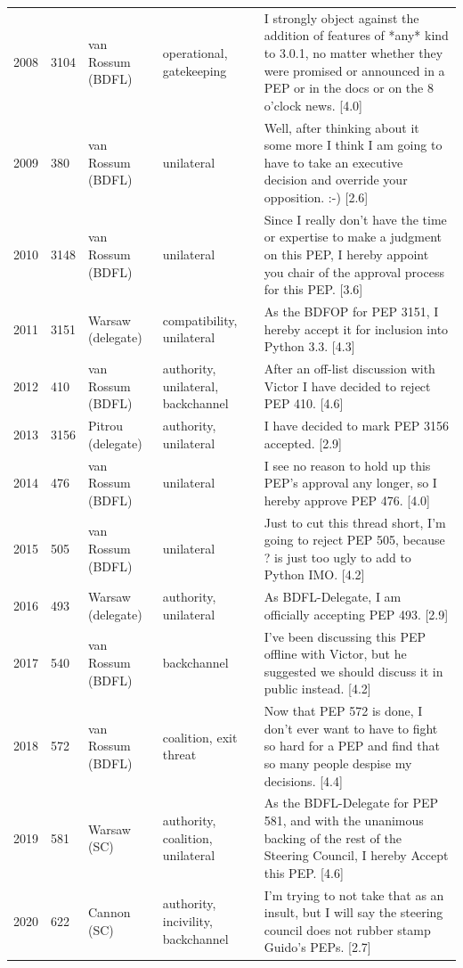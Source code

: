 \begin{table}[t]
\begin{tabular}{p{}p{}p{}p{}p{}}
2008 & 3104 & van Rossum (BDFL) & operational, gatekeeping & I strongly object against the addition of features of *any* kind to 3.0.1, no matter whether they were promised or announced in a PEP or in the docs or on the 8 o'clock news. [4.0] \\
2009 & 380 & van Rossum (BDFL) & unilateral & Well, after thinking about it some more I think I am going to have to take an executive decision and override your opposition. :-) [2.6] \\
2010 & 3148 & van Rossum (BDFL) & unilateral & Since I really don't have the time or expertise to make a judgment on this PEP, I hereby appoint you chair of the approval process for this PEP. [3.6] \\
2011 & 3151 & Warsaw (delegate) & compatibility, unilateral & As the BDFOP for PEP 3151, I hereby accept it for inclusion into Python 3.3. [4.3] \\
2012 & 410 & van Rossum (BDFL) & authority, unilateral, backchannel & After an off-list discussion with Victor I have decided to reject PEP 410. [4.6] \\
2013 & 3156 & Pitrou (delegate) & authority, unilateral & I have decided to mark PEP 3156 accepted. [2.9] \\
2014 & 476 & van Rossum (BDFL) & unilateral & I see no reason to hold up this PEP's approval any longer, so I hereby approve PEP 476. [4.0] \\
2015 & 505 & van Rossum (BDFL) & unilateral & Just to cut this thread short, I'm going to reject PEP 505, because ? is just too ugly to add to Python IMO. [4.2] \\
2016 & 493 & Warsaw (delegate) & authority, unilateral & As BDFL-Delegate, I am officially accepting PEP 493. [2.9] \\
2017 & 540 & van Rossum (BDFL) & backchannel & I've been discussing this PEP offline with Victor, but he suggested we should discuss it in public instead. [4.2] \\
2018 & 572 & van Rossum (BDFL) & coalition, exit threat & Now that PEP 572 is done, I don't ever want to have to fight so hard for a PEP and find that so many people despise my decisions. [4.4] \\
2019 & 581 & Warsaw (SC) & authority, coalition, unilateral & As the BDFL-Delegate for PEP 581, and with the unanimous backing of the rest of the Steering Council, I hereby Accept this PEP. [4.6] \\
2020 & 622 & Cannon (SC) & authority, incivility, backchannel & I'm trying to not take that as an insult, but I will say the steering council does not rubber stamp Guido's PEPs. [2.7] \\

\end{tabular}
\end{table}
